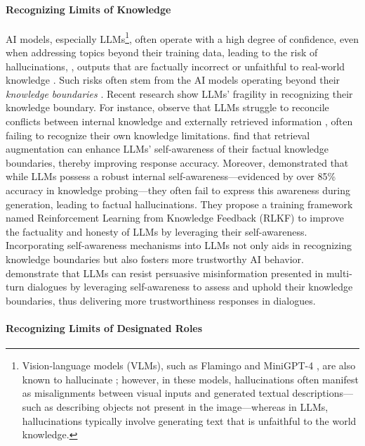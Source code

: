 \paragraph{Recognizing Limits of Knowledge}

AI models, especially LLMs\footnote{Vision-language models (VLMs), such as Flamingo \citep{alayrac2022flamingo} and MiniGPT-4 \citep{zhuminigpt}, are also known to hallucinate \cite{li2023evaluating}; however, in these models, hallucinations often manifest as misalignments between visual inputs and generated textual descriptions—such as describing objects not present in the image—whereas in LLMs, hallucinations typically involve generating text that is unfaithful to the world knowledge.}, often operate with a high degree of confidence, even when addressing topics beyond their training data, leading to the risk of hallucinations, \ie, outputs that are factually incorrect or unfaithful to real-world knowledge \cite{huang2025survey}. Such risks often stem from the AI models operating beyond their \emph{knowledge boundaries} \citep{ni2024llms, ren2025investigating}.
Recent research show LLMs' fragility in recognizing their knowledge boundary. For instance, \citet{ren2025investigating} observe that LLMs struggle to reconcile conflicts between internal knowledge and externally retrieved information \cite{xu2024knowledge}, often failing to recognize their own knowledge limitations. \citet{ni2024llms} find that retrieval augmentation can enhance LLMs' self-awareness of their factual knowledge boundaries, thereby improving response accuracy. 
Moreover, \citet{liang2024learning} demonstrated that while LLMs possess a robust internal self-awareness—evidenced by over 85\% accuracy in knowledge probing—they often fail to express this awareness during generation, leading to factual hallucinations. They propose a training framework named Reinforcement Learning from Knowledge Feedback (RLKF) to improve the factuality and honesty of LLMs by leveraging their self-awareness.
Incorporating self-awareness mechanisms into LLMs not only aids in recognizing knowledge boundaries but also fosters more trustworthy AI behavior.
\citet{xu2024earth} demonstrate that LLMs can resist persuasive misinformation presented in multi-turn dialogues by leveraging self-awareness to assess and uphold their knowledge boundaries, thus delivering more trustworthiness responses in dialogues.

\paragraph{Recognizing Limits of Designated Roles}

